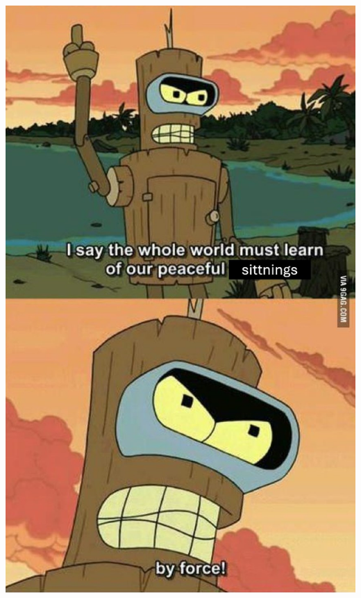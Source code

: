 \documentclass{article}
\begin{document}
\newpage
\begin{center}
\vspace*{15em}
\includegraphics[width=\linewidth]{images/memes/bender.jpg}
\end{center}
\vfill
\license
\end{document}
